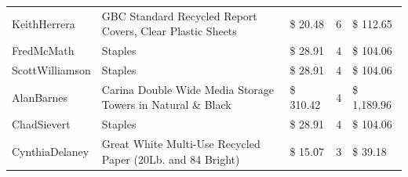 \documentclass[11pt]{article} %
\begin{document}
\begin{table}[H]
\begin{tabular}{@{}lp{4cm}lll@{}}
KeithHerrera                                                                            & GBC Standard Recycled Report Covers, Clear Plastic Sheets                                   & \$     20.48                                                                                 & 6                                                                                    & \$        112.65                                                                        \\
FredMcMath                                                                              & Staples                                                                                     & \$     28.91                                                                                 & 4                                                                                    & \$        104.06                                                                        \\
ScottWilliamson                                                                         & Staples                                                                                     & \$     28.91                                                                                 & 4                                                                                    & \$        104.06                                                                        \\
AlanBarnes                                                                              & Carina Double Wide Media Storage Towers in Natural \& Black                                 & \$   310.42                                                                                  & 4                                                                                    & \$     1,189.96                                                                         \\
ChadSievert                                                                             & Staples                                                                                     & \$     28.91                                                                                 & 4                                                                                    & \$        104.06                                                                        \\
CynthiaDelaney                                                                          & Great White Multi-Use Recycled Paper (20Lb. and 84 Bright)                                  & \$     15.07                                                                                 & 3                                                                                    & \$           39.18                                                                      \\

\end{tabular}
\end{table}
\end{document}
